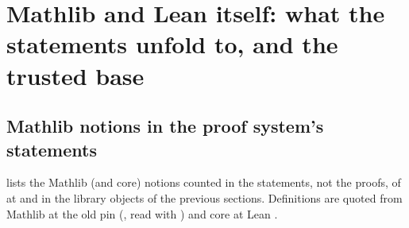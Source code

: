 \begingroup\sloppy
\section{Mathlib and Lean itself: what the statements unfold to, and the trusted base}\label{sec:gen-lib-lean}

\subsection{Mathlib notions in the proof system's statements}\label{sec:gen-lib-lean-mathlib}

 lists the Mathlib (and core) notions counted in the statements, not
the proofs, of \allowbreak{} at  and in the library objects of the
previous sections. Definitions are quoted from Mathlib at the old pin 
(, read with ) and core at Lean .


